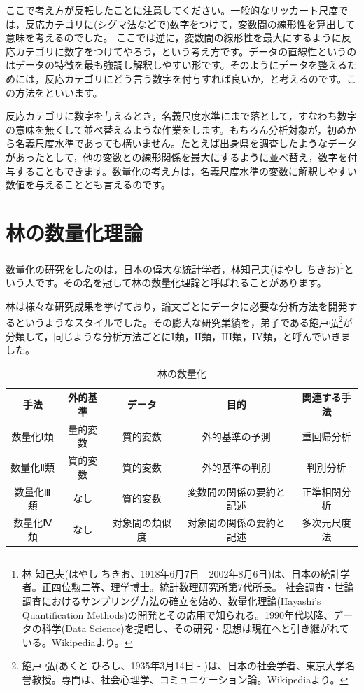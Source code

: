 \documentclass{ltjsbook}
\begin{document}
ここで考え方が反転したことに注意してください。一般的なリッカート尺度では，反応カテゴリに(シグマ法などで)数字をつけて，変数間の線形性を算出して意味を考えるのでした。
ここでは逆に，変数間の線形性を最大にするように反応カテゴリに数字をつけてやろう，という考え方です。データの直線性というのはデータの特徴を最も強調し解釈しやすい形です。そのようにデータを整えるためには，反応カテゴリにどう言う数字を付与すれば良いか，と考えるのです。この方法をといいます。

反応カテゴリに数字を与えるとき，名義尺度水準にまで落として，すなわち数字の意味を無くして並べ替えるような作業をします。もちろん分析対象が，初めから名義尺度水準であっても構いません。たとえば出身県を調査したようなデータがあったとして，他の変数との線形関係を最大にするように並べ替え，数字を付与することもできます。数量化の考え方は，名義尺度水準の変数に解釈しやすい数値を与えることとも言えるのです。

\section{林の数量化理論}
数量化の研究をしたのは，日本の偉大な統計学者，林知己夫(はやし ちきお)\footnote{林 知己夫(はやし ちきお、1918年6月7日 - 2002年8月6日)は、日本の統計学者。正四位勲二等、理学博士。統計数理研究所第7代所長。 社会調査・世論調査におけるサンプリング方法の確立を始め、数量化理論(Hayashi's Quantification Methods)の開発とその応用で知られる。1990年代以降、データの科学(Data Science)を提唱し、その研究・思想は現在へと引き継がれている。Wikipediaより。}という人です。その名を冠して林の数量化理論と呼ばれることがあります。

林は様々な研究成果を挙げており，論文ごとにデータに必要な分析方法を開発するというようなスタイルでした。その膨大な研究業績を，弟子である飽戸弘\footnote{飽戸 弘(あくと ひろし、1935年3月14日 - )は、日本の社会学者、東京大学名誉教授。専門は、社会心理学、コミュニケーション論。Wikipediaより。}が分類して，同じような分析方法ごとにI類，II類，III類，IV類，と呼んでいきました。

\begin{table}[h]
	\caption{林の数量化}
	\begin{tabular}{c|c|c|c|c}
	手法 & 外的基準 & データ & 目的 & 関連する手法\\
	\hline
	数量化Ⅰ類 & 量的変数 & 質的変数 & 外的基準の予測 & 重回帰分析\\
	数量化Ⅱ類 & 質的変数 & 質的変数 & 外的基準の判別 & 判別分析\\
	数量化Ⅲ類 & なし & 質的変数 & 変数間の関係の要約と記述 & 正準相関分析\\
	数量化Ⅳ類 & なし & 対象間の類似度 & 対象間の関係の要約と記述 & 多次元尺度法\\
	\end{tabular}
	\label{tbl::14_03}
\end{table}
\end{document}

